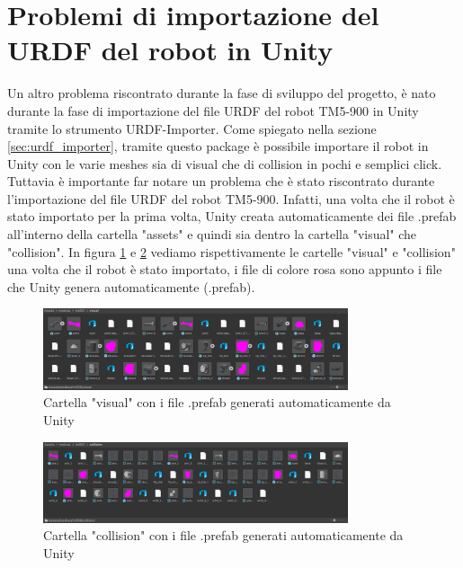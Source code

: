 \documentclass[11pt]{report}
\begin{document}
\section{Problemi di importazione del URDF del robot in Unity}
\label{sec:Problemi_importazione_URDF}
Un altro problema riscontrato durante la fase di sviluppo del progetto, è nato durante la fase di importazione del file URDF del robot TM5-900 in Unity tramite lo strumento URDF-Importer. Come spiegato nella sezione \ref{sec:urdf_importer}, tramite questo package è possibile importare il robot in Unity con le varie meshes sia di visual che di collision in pochi e semplici click. Tuttavia è importante far notare un problema che è stato riscontrato durante l'importazione del file URDF del robot TM5-900. Infatti, una volta che il robot è stato importato per la prima volta, Unity creata automaticamente dei file .prefab all'interno della cartella "assets" e quindi sia dentro la cartella "visual" che "collision". In figura \ref{fig:visual_prefab} e \ref{fig:collision_prefab} vediamo rispettivamente le cartelle "visual" e "collision" una volta che il robot è stato importato, i file di colore rosa sono appunto i file che Unity genera automaticamente (.prefab).

\begin{figure} [H]
    \centering
    \includegraphics[width=0.8\textwidth]{images/prefab_visual.PNG}
    \caption{Cartella "visual" con i file .prefab generati automaticamente da Unity}
    \label{fig:visual_prefab}
\end{figure}

\begin{figure} [H]
    \centering
    \includegraphics[width=0.8\textwidth]{images/prefab_collision.PNG}
    \caption{Cartella "collision" con i file .prefab generati automaticamente da Unity}
    \label{fig:collision_prefab}
\end{figure}
\end{document}
